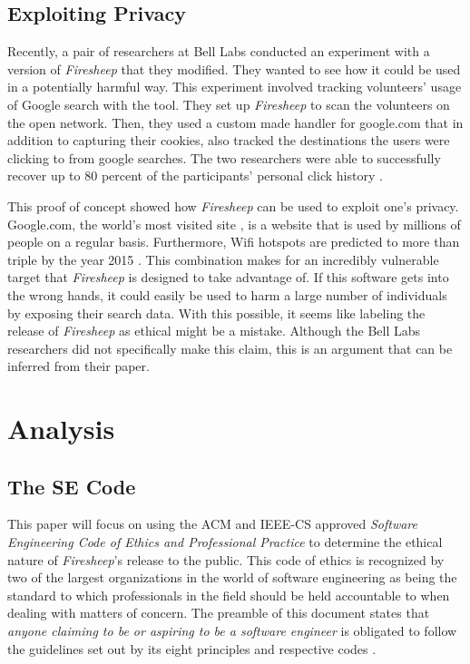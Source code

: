 \documentclass[11pt]{article}
\begin{document}
\begin{multicols}{2}
\subsection{Exploiting Privacy}
Recently, a pair of researchers at Bell Labs conducted an experiment with a version of \emph{Firesheep} that they modified. They wanted to see how it could be used in a potentially harmful way. This experiment involved tracking volunteers' usage of Google search with the tool. They set up \emph{Firesheep} to scan the volunteers on the open network. Then, they used a custom made handler for google.com that in addition to capturing their cookies, also tracked the destinations the users were clicking to from google searches. The two researchers were able to successfully recover up to 80 percent of the participants' personal click history \cite{show_me_your_cookie}.

This proof of concept showed how \emph{Firesheep} can be used to exploit one's privacy. Google.com, the world's most visited site \cite{alexa}, is a website that is used by millions of people on a regular basis. Furthermore, Wifi hotspots are predicted to more than triple by the year 2015 \cite{informa}. This combination makes for an incredibly vulnerable target that \emph{Firesheep} is designed to take advantage of. If this software gets into the wrong hands, it could easily be used to harm a large number of individuals by exposing their search data. With this possible, it seems like labeling the release of \emph{Firesheep} as ethical might be a mistake. Although the Bell Labs researchers did not specifically make this claim, this is an argument that can be inferred from their paper.

\section{Analysis}
\subsection{The SE Code}
This paper will focus on using the ACM and IEEE-CS approved \emph{Software Engineering Code of Ethics and Professional Practice} \cite{se_code} to determine the ethical nature of \emph{Firesheep}'s release to the public. This code of ethics is recognized by two of the largest organizations in the world of software engineering as being the standard to which professionals in the field should be held accountable to when dealing with matters of concern. The preamble of this document states that \emph{anyone claiming to be or aspiring to be a software engineer} is obligated to follow the guidelines set out by its eight principles and respective codes \cite{se_code}.


\end{multicols}
\end{document}
